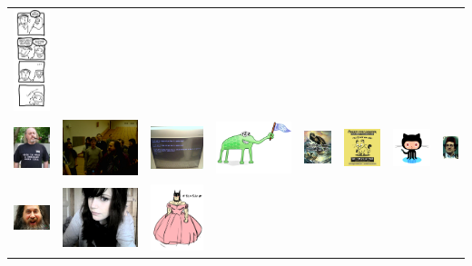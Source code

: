 \documentclass{beamer}
\begin{document}
\begin{frame}
\begin{tabular}{cccccccc}
    \includegraphics[height=.3in,width=.3in,keepaspectratio]{../images/48.jpg} \\
    \includegraphics[height=.3in,width=.3in,keepaspectratio]{../images/49.jpg} &
    \includegraphics[height=.3in,width=.3in,keepaspectratio]{../images/50.jpg} &
    \includegraphics[height=.3in,width=.3in,keepaspectratio]{../images/51.jpg} &
    \includegraphics[height=.3in,width=.3in,keepaspectratio]{../images/52.png} &
    \includegraphics[height=.3in,width=.3in,keepaspectratio]{../images/53.jpg} &
    \includegraphics[height=.3in,width=.3in,keepaspectratio]{../images/54.jpg} &
    \includegraphics[height=.3in,width=.3in,keepaspectratio]{../images/55.png} &
    \includegraphics[height=.3in,width=.3in,keepaspectratio]{../images/56.jpg} \\
    \includegraphics[height=.3in,width=.3in,keepaspectratio]{../images/57.jpg} &
    \includegraphics[height=.3in,width=.3in,keepaspectratio]{../images/58.jpg} &
    \includegraphics[height=.3in,width=.3in,keepaspectratio]{../images/59.png} &

\end{tabular}
\end{frame}
\end{document}
